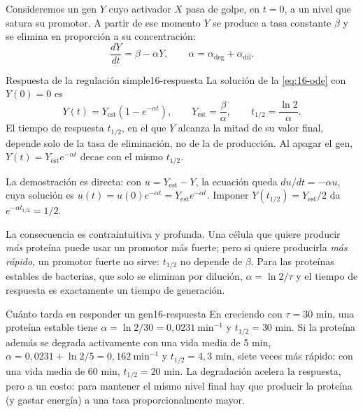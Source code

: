 Consideremos un gen $Y$ cuyo activador $X$ pasa de golpe, en $t=0$, a un nivel que satura su promotor. A partir de ese momento $Y$ se produce a tasa constante $\beta$ y se elimina en proporción a su concentración:
\begin{equation}\label{eq:16-ode}
\frac{dY}{dt}=\beta-\alpha Y,\qquad \alpha=\alpha_{\text{deg}}+\alpha_{\text{dil}}.
\end{equation}
\begin{simbolos}
\end{simbolos}

\begin{teorema}{Respuesta de la regulación simple}{16-respuesta}
La solución de la \cref{eq:16-ode} con $Y(0)=0$ es
\begin{equation}\label{eq:16-sol}
Y(t)=Y_{\text{est}}\left(1-e^{-\alpha t}\right),\qquad Y_{\text{est}}=\frac{\beta}{\alpha},\qquad t_{1/2}=\frac{\ln 2}{\alpha}.
\end{equation}
El tiempo de respuesta $t_{1/2}$, en el que $Y$ alcanza la mitad de su valor final, depende solo de la tasa de eliminación, no de la de producción. Al apagar el gen, $Y(t)=Y_{\text{est}}e^{-\alpha t}$ decae con el mismo $t_{1/2}$.
\end{teorema}
La demostración es directa: con $u=Y_{\text{est}}-Y$, la ecuación queda $du/dt=-\alpha u$, cuya solución es $u(t)=u(0)e^{-\alpha t}=Y_{\text{est}}e^{-\alpha t}$. Imponer $Y(t_{1/2})=Y_{\text{est}}/2$ da $e^{-\alpha t_{1/2}}=1/2$.

La consecuencia es contraintuitiva y profunda. Una célula que quiere producir \emph{más} proteína puede usar un promotor más fuerte; pero si quiere producirla \emph{más rápido}, un promotor fuerte no sirve: $t_{1/2}$ no depende de $\beta$. Para las proteínas estables de bacterias, que solo se eliminan por dilución, $\alpha=\ln2/\tau$ y el tiempo de respuesta es exactamente un tiempo de generación.

\begin{ejemplo}{Cuánto tarda en responder un gen}{16-respuesta}
En  creciendo con $\tau=30$ min, una proteína estable tiene $\alpha=\ln2/30=0{,}0231\ \text{min}^{-1}$ y $t_{1/2}=30$ min. Si la proteína además se degrada activamente con una vida media de 5 min, $\alpha=0{,}0231+\ln2/5=0{,}162\ \text{min}^{-1}$ y $t_{1/2}=4{,}3$ min, siete veces más rápido; con una vida media de 60 min, $t_{1/2}=20$ min. La degradación acelera la respuesta, pero a un costo: para mantener el mismo nivel final hay que producir la proteína (y gastar energía) a una tasa proporcionalmente mayor.
\end{ejemplo}

